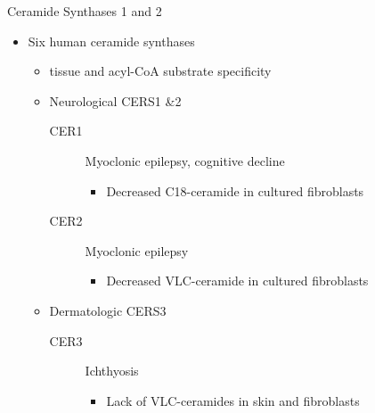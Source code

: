 \documentclass[presentation, smaller]{beamer}
\begin{document}
\begin{frame}[label={sec:orgheadline8}]{Ceramide Synthases 1 and 2}
\begin{itemize}
\item Six human ceramide synthases
\begin{itemize}
\item tissue and acyl-CoA substrate specificity
\item Neurological CERS1 \&2
\begin{description}
\item[{CER1}] Myoclonic epilepsy, cognitive decline
\begin{itemize}
\item Decreased C18-ceramide in cultured fibroblasts
\end{itemize}
\item[{CER2}] Myoclonic epilepsy
\begin{itemize}
\item Decreased VLC-ceramide in cultured fibroblasts
\end{itemize}
\end{description}
\item Dermatologic CERS3
\begin{description}
\item[{CER3}] Ichthyosis
\begin{itemize}
\item Lack of VLC-ceramides in skin and fibroblasts
\end{itemize}
\end{description}
\end{itemize}
\end{itemize}
\end{frame}
\end{document}
